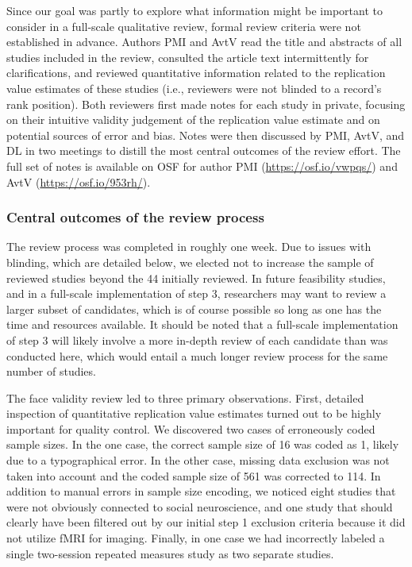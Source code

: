 \documentclass[
  man,floatsintext]{apa6}
\begin{document}
Since our goal was partly to explore what information might be important to consider in a full-scale qualitative review, formal review criteria were not established in advance. Authors PMI and AvtV read the title and abstracts of all studies included in the review, consulted the article text intermittently for clarifications, and reviewed quantitative information related to the replication value estimates of these studies (i.e., reviewers were not blinded to a record's rank position). Both reviewers first made notes for each study in private, focusing on their intuitive validity judgement of the replication value estimate and on potential sources of error and bias. Notes were then discussed by PMI, AvtV, and DL in two meetings to distill the most central outcomes of the review effort. The full set of notes is available on OSF for author PMI (\url{https://osf.io/vwpqs/}) and AvtV (\url{https://osf.io/953rh/}).

\hypertarget{central-outcomes-of-the-review-process}{%
\subsubsection{Central outcomes of the review process}\label{central-outcomes-of-the-review-process}}

The review process was completed in roughly one week. Due to issues with blinding, which are detailed below, we elected not to increase the sample of reviewed studies beyond the 44 initially reviewed. In future feasibility studies, and in a full-scale implementation of step 3, researchers may want to review a larger subset of candidates, which is of course possible so long as one has the time and resources available. It should be noted that a full-scale implementation of step 3 will likely involve a more in-depth review of each candidate than was conducted here, which would entail a much longer review process for the same number of studies.

The face validity review led to three primary observations. First, detailed inspection of quantitative replication value estimates turned out to be highly important for quality control. We discovered two cases of erroneously coded sample sizes. In the one case, the correct sample size of 16 was coded as 1, likely due to a typographical error. In the other case, missing data exclusion was not taken into account and the coded sample size of 561 was corrected to 114. In addition to manual errors in sample size encoding, we noticed eight studies that were not obviously connected to social neuroscience, and one study that should clearly have been filtered out by our initial step 1 exclusion criteria because it did not utilize fMRI for imaging. Finally, in one case we had incorrectly labeled a single two-session repeated measures study as two separate studies.
\end{document}
